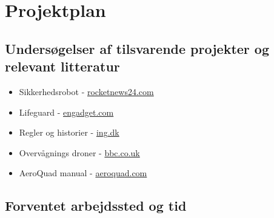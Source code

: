 \documentclass[Main]{subfiles}
\begin{document}
\chapter{Projektplan}


\section{Undersøgelser af tilsvarende projekter og relevant litteratur}


	\begin{itemize}
	\item Sikkerhedsrobot - \href{http://en.rocketnews24.com/2012/12/29/secom-unveils-worlds-first-flying-crime-prevention-robot/}{rocketnews24.com}
	
	\item Lifeguard - \href{http://www.engadget.com/2012/09/19/uav-lifeguards-to-patrol-australian-beaches/}{engadget.com}
	
	\item Regler og historier - \href{http://ing.dk/artikel/foerste-droneflyver-meldt-til-politiet-159138}{ing.dk}
	
	\item Overvågnings droner - \href{http://www.bbc.co.uk/news/world-europe-22678580}{bbc.co.uk}
	
	\item AeroQuad manual - \href{http://aeroquad.com/showwiki.php?title=Book:AeroQuad+Manual}{aeroquad.com}

	\end{itemize}



\section{Forventet arbejdssted og tid}
\end{document}

